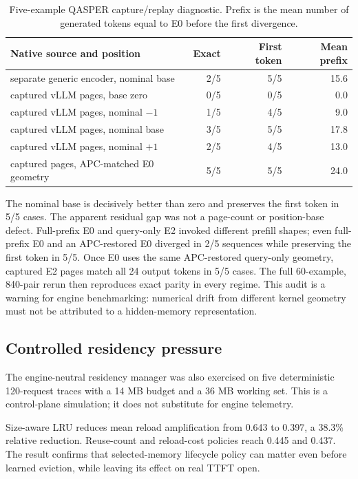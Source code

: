 \documentclass[10pt]{article}
\begin{document}
\begin{table}[t]
\centering
\small
\caption{Five-example QASPER capture/replay diagnostic. Prefix is the mean
number of generated tokens equal to E0 before the first divergence.}
\begin{tabular}{lrrr}
\toprule
Native source and position & Exact & First token & Mean prefix \\
\midrule
separate generic encoder, nominal base & 2/5 & 5/5 & 15.6 \\
captured vLLM pages, base zero & 0/5 & 0/5 & 0.0 \\
captured vLLM pages, nominal $-1$ & 1/5 & 4/5 & 9.0 \\
captured vLLM pages, nominal base & 3/5 & 5/5 & 17.8 \\
captured vLLM pages, nominal $+1$ & 2/5 & 4/5 & 13.0 \\
captured pages, APC-matched E0 geometry & 5/5 & 5/5 & 24.0 \\
\bottomrule
\end{tabular}
\label{tab:vllm-capture-replay}
\end{table}

The nominal base is decisively better than zero and preserves the first token
in 5/5 cases. The apparent residual gap was not a page-count or position-base
defect. Full-prefix E0 and query-only E2 invoked different prefill shapes; even
full-prefix E0 and an APC-restored E0 diverged in 2/5 sequences while preserving
the first token in 5/5. Once E0 uses the same APC-restored query-only geometry,
captured E2 pages match all 24 output tokens in 5/5 cases. The full 60-example,
840-pair rerun then reproduces exact parity in every regime. This audit is a
warning for engine benchmarking: numerical drift from different kernel
geometry must not be attributed to a hidden-memory representation.

\subsection{Controlled residency pressure}
The engine-neutral residency manager was also exercised on five deterministic
120-request traces with a 14 MB budget and a 36 MB working set. This is a
control-plane simulation; it does not substitute for engine telemetry.
\begin{table}[t]
\centering
\small
\caption{Fixed-budget residency pressure over five seeds. Reload amplification
is physical loads divided by requests; lower is better.}

\label{tab:residency}
\end{table}
Size-aware LRU reduces mean reload amplification from 0.643 to 0.397, a 38.3\%
relative reduction. Reuse-count and reload-cost policies reach 0.445 and 0.437.
The result confirms that selected-memory lifecycle policy can matter even
before learned eviction, while leaving its effect on real TTFT open.
\end{document}
